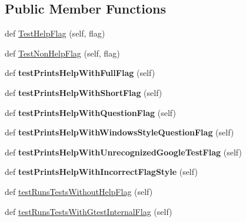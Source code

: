 \subsection*{Public Member Functions}
\begin{DoxyCompactItemize}
\item 
def \mbox{\hyperlink{classgtest__help__test_1_1_g_test_help_test_a26cc1a64bd67278252ebfcd0ac0dca0c}{Test\+Help\+Flag}} (self, flag)
\item 
def \mbox{\hyperlink{classgtest__help__test_1_1_g_test_help_test_a03ffa91ecf6193ed2ed80b53933112ab}{Test\+Non\+Help\+Flag}} (self, flag)
\item 
\mbox{\label{classgtest__help__test_1_1_g_test_help_test_ad91b46ad4506ff52b337b63f6b6c2ad1}} 
def {\bfseries test\+Prints\+Help\+With\+Full\+Flag} (self)
\item 
\mbox{\label{classgtest__help__test_1_1_g_test_help_test_a3dd96058d093a89350769b4e2cc36563}} 
def {\bfseries test\+Prints\+Help\+With\+Short\+Flag} (self)
\item 
\mbox{\label{classgtest__help__test_1_1_g_test_help_test_aafd4d1857c2538c8b1f7cc5a5d1e38b4}} 
def {\bfseries test\+Prints\+Help\+With\+Question\+Flag} (self)
\item 
\mbox{\label{classgtest__help__test_1_1_g_test_help_test_a7be99cd30193e2eecf79f9d65f561afc}} 
def {\bfseries test\+Prints\+Help\+With\+Windows\+Style\+Question\+Flag} (self)
\item 
\mbox{\label{classgtest__help__test_1_1_g_test_help_test_a701abb8f34df726b9129d7654cb32066}} 
def {\bfseries test\+Prints\+Help\+With\+Unrecognized\+Google\+Test\+Flag} (self)
\item 
\mbox{\label{classgtest__help__test_1_1_g_test_help_test_ab8d379bbb0da7403ced599f4ee498728}} 
def {\bfseries test\+Prints\+Help\+With\+Incorrect\+Flag\+Style} (self)
\item 
def \mbox{\hyperlink{classgtest__help__test_1_1_g_test_help_test_ae7831f92e8e3763c07afb908915b3d20}{test\+Runs\+Tests\+Without\+Help\+Flag}} (self)
\item 
def \mbox{\hyperlink{classgtest__help__test_1_1_g_test_help_test_a0ebec2e3154d22a63e362d2196f9c638}{test\+Runs\+Tests\+With\+Gtest\+Internal\+Flag}} (self)
\end{DoxyCompactItemize}


